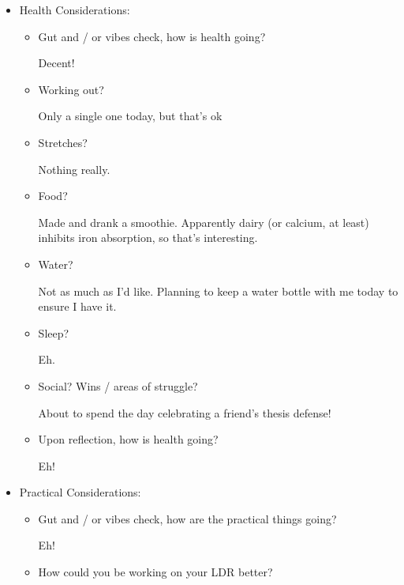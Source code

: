 \documentclass[12pt]{article}
\renewcommand{\,}{\textsuperscript{,}}
\begin{document}
\begin{itemize}
\begin{itemize}
\begin{itemize}
\end{itemize}  
 \item Upon reflection, how is creation going?

Goes!  
 \end{itemize}  
   
 \item Health Considerations:  
 \begin{itemize}  
 \item Gut and / or vibes check, how is health going?

Decent!

\item Working out?

Only a single one today, but that's ok  
   
 \item Stretches?

Nothing really.

\item Food?

Made and drank a smoothie. Apparently dairy (or calcium, at least) inhibits iron absorption, so that's interesting.

\item Water?

Not as much as I'd like. Planning to keep a water bottle with me today to ensure I have it.

\item Sleep?

Eh.

\item Social? Wins / areas of struggle?

About to spend the day celebrating a friend's thesis defense!

\item Upon reflection, how is health going?

Eh!

\end{itemize}  
   
 \item Practical Considerations:  
 \begin{itemize}  
 \item Gut and / or vibes check, how are the practical things going?

Eh!

\item How could you be working on your LDR better?


\end{itemize}
\end{itemize}
\end{document}
